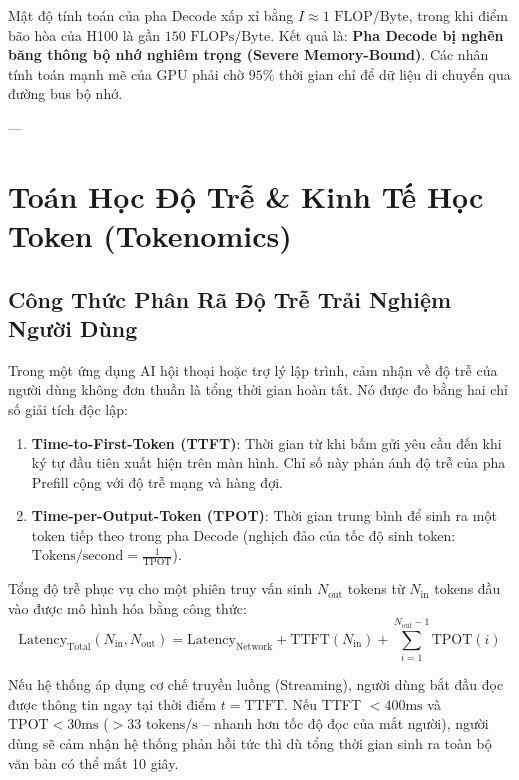 Mật độ tính toán của pha Decode xấp xỉ bằng $I \approx 1\text{ FLOP/Byte}$, trong khi điểm bão hòa của H100 là gần $150\text{ FLOPs/Byte}$. Kết quả là: \textbf{Pha Decode bị nghẽn băng thông bộ nhớ nghiêm trọng (Severe Memory-Bound)}. Các nhân tính toán mạnh mẽ của GPU phải chờ $95\%$ thời gian chỉ để dữ liệu di chuyển qua đường bus bộ nhớ.

---

\section{Toán Học Độ Trễ \& Kinh Tế Học Token (Tokenomics)}
\label{sec:tokenomics-and-latency}

\subsection{Công Thức Phân Rã Độ Trễ Trải Nghiệm Người Dùng}

Trong một ứng dụng AI hội thoại hoặc trợ lý lập trình, cảm nhận về độ trễ của người dùng không đơn thuần là tổng thời gian hoàn tất. Nó được đo bằng hai chỉ số giải tích độc lập:

\begin{enumerate}
  \item \textbf{Time-to-First-Token (TTFT)}: Thời gian từ khi bấm gửi yêu cầu đến khi ký tự đầu tiên xuất hiện trên màn hình. Chỉ số này phản ánh độ trễ của pha Prefill cộng với độ trễ mạng và hàng đợi.
  \item \textbf{Time-per-Output-Token (TPOT)}: Thời gian trung bình để sinh ra một token tiếp theo trong pha Decode (nghịch đảo của tốc độ sinh token: $\text{Tokens/second} = \frac{1}{\text{TPOT}}$).
\end{enumerate}

Tổng độ trễ phục vụ cho một phiên truy vấn sinh $N_{\text{out}}$ tokens từ $N_{\text{in}}$ tokens đầu vào được mô hình hóa bằng công thức:
\begin{equation}
\text{Latency}_{\text{Total}}(N_{\text{in}}, N_{\text{out}}) = \text{Latency}_{\text{Network}} + \text{TTFT}(N_{\text{in}}) + \sum_{i=1}^{N_{\text{out}}-1} \text{TPOT}(i)
\label{eq:total-latency-formula}
\end{equation}

Nếu hệ thống áp dụng cơ chế truyền luồng (Streaming), người dùng bắt đầu đọc được thông tin ngay tại thời điểm $t = \text{TTFT}$. Nếu TTFT $< 400\text{ms}$ và $\text{TPOT} < 30\text{ms}$ ($> 33\text{ tokens/s}$ -- nhanh hơn tốc độ đọc của mắt người), người dùng sẽ cảm nhận hệ thống phản hồi tức thì dù tổng thời gian sinh ra toàn bộ văn bản có thể mất 10 giây.

